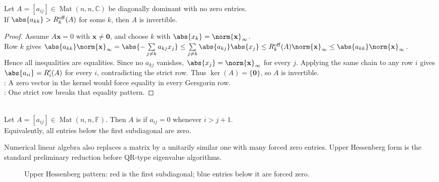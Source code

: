\begin{theorem} \label{thm:weak-diagonal-dominance-invertible-with-one-strict-row} \\
Let $A=[a_{ij}]\in\operatorname{Mat}(n,n,\mathbb{C})$ be diagonally dominant with no zero entries.\\
If $\abs{a_{kk}}>R_k^{\mathrm{off}}(A)$ for some $k$, then $A$ is invertible.
\begin{proof}
Assume $A\mathbf{x}=0$ with $\mathbf{x}\neq\mathbf{0}$, and choose $k$ with $\abs{x_k}=\norm{\mathbf{x}}_{\infty}$.\\
Row $k$ gives $\abs{a_{kk}}\norm{\mathbf{x}}_{\infty} =\abs{-\sum\limits_{j\neq k}a_{kj}x_j} \leq\sum\limits_{j\neq k}\abs{a_{kj}}\abs{x_j} \leq R_k^{\mathrm{off}}(A)\norm{\mathbf{x}}_{\infty} \leq \abs{a_{kk}}\norm{\mathbf{x}}_{\infty}$.\\
Hence all inequalities are equalities. Since no $a_{kj}$ vanishes, $\abs{x_j}=\norm{\mathbf{x}}_{\infty}$ for every $j$. Applying the same chain to any row $i$ gives $\abs{a_{ii}}=R'_i(A)$ for every $i$, contradicting the strict row. Thus $\ker(A)=\{\mathbf{0}\}$, so $A$ is invertible.\\
: A zero vector in the kernel would force equality in every Gersgorin row.\\
: One strict row breaks that equality pattern.
\end{proof}
\end{theorem}

\begin{definition} \label{def:upper-hessenberg-matrix} \\
Let $A=[a_{ij}]\in\operatorname{Mat}(n,n,\mathbb{F})$. Then $A$ is  if $a_{ij}=0$ whenever $i>j+1$.\\
Equivalently, all entries below the first subdiagonal are zero.
\end{definition}

Numerical linear algebra also replaces a matrix by a unitarily similar one with many forced zero entries. Upper Hessenberg form is the standard preliminary reduction before QR-type eigenvalue algorithms.

\begin{figure}[H]
  \centering
  
  \caption{Upper Hessenberg pattern: red is the first subdiagonal; blue entries below it are forced zero.}
  \label{fig:upper-hessenberg-pattern}
\end{figure}

